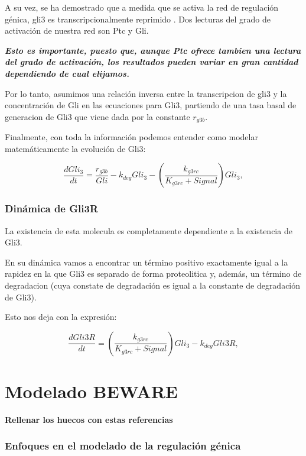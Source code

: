  A su vez, se ha demostrado que a medida que se activa la red de regulación génica, gli3 es transcripcionalmente
 reprimido \cite{wang2000hedgehog}. Dos lecturas del grado de activación de nuestra red son Ptc y Gli. 
 
 \textbf{\textit{Esto es importante, puesto que, aunque Ptc ofrece tambien una lectura del grado de activación, los resultados pueden variar en gran cantidad dependiendo de cual elijamos.}}
 
 Por lo tanto, asumimos una relación inversa entre la transcripcion de gli3 y la concentración de Gli en las ecuaciones para Gli3, partiendo de una tasa basal de generacion de Gli3 que viene dada por la constante $r_{g3b}$. 
 
 Finalmente, con toda la información podemos entender como modelar matemáticamente la evolución de Gli3:
 
  \begin{equation}
  \frac{dGli_3}{dt} = \frac{r_{g3b}}{Gli}-k_{deg}Gli_3-\left(\frac{k_{g3rc}}{K_{g3rc}+Signal}\right)Gli_3,
  \end{equation}
 
 \subsubsection{Dinámica de Gli3R}
 La existencia de esta molecula es completamente dependiente a la existencia de Gli3.
 
 En su dinámica vamos a encontrar un término positivo exactamente igual a la rapidez en la que Gli3 es separado de forma proteolitica y, además, un término de degradacion (cuya constate de degradación es igual a la constante de degradación de Gli3).
 
  Esto nos deja con la expresión:

 
 \begin{equation}
 \frac{dGli3R}{dt}= \left(\frac{k_{g3rc}}{K_{g3rc}+Signal}\right)Gli_3-k_{deg}Gli3R,
 \end{equation}
 
 \section{Modelado BEWARE}
\cite{ay2011mathematical}
 \cite{bintu2005transcriptional} \cite{bintu2005transcriptional2}
 \cite{fakhouri2010deciphering}
 \cite{he2010thermodynamics}
 \cite{segal2008predicting}
 \textbf{Rellenar los huecos con estas referencias}
 
 \subsubsection{Enfoques en el modelado de la regulación génica}
 
